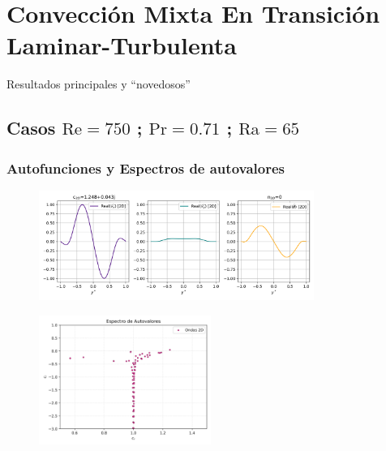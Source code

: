 \chapter{Convección Mixta En Transición Laminar-Turbulenta}

Resultados principales y ``novedosos''


\newpage

\section{Casos $\text{Re}=750$ ; $\text{Pr}=0.71$ ; $\text{Ra}=65$}

\begin{table}[H]
\centering
{}
\caption{}
\label{tab:grupo1}
\end{table}

\subsection{Autofunciones y Espectros de autovalores}

\begin{figure}[H]
  \centering
    \includegraphics[width=0.8\textwidth]{figures/cap6/Re750-Ri1Em4-Pr071/Re750-Pr071-Ri1Em4_eigenfun_A1.png}
  \caption{}
  \label{fig:eigenfuns-Re750-Pr071}
\end{figure}

\begin{figure}[H]
  \centering
    \includegraphics[width=0.5\textwidth]{figures/cap6/Re750-Ri1Em4-Pr071/Re750-Pr071-Ri1Em4_eigenvals.png}
  \caption{}
  \label{fig:spectra-Re750-Pr071}
\end{figure}

